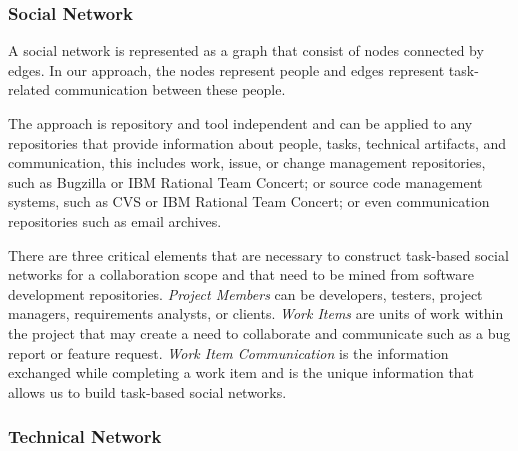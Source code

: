 \subsubsection{Social Network}
A social network is represented as a graph that consist of nodes connected by edges. 
In our approach, the nodes represent people and edges represent task-related communication between these people.

The approach is repository and tool independent and can be applied to any repositories that provide information about people, tasks, technical artifacts, and communication, this includes work, issue, or change management repositories, such as Bugzilla or IBM Rational Team Concert; or source code management systems, such as CVS or IBM Rational Team Concert; or even communication repositories such as email archives.

There are three critical elements that are necessary to construct task-based social networks for a collaboration scope and that need to be mined from software development repositories.
\emph{Project Members}  can be developers, testers, project managers, requirements analysts,
or clients. 
\emph{Work Items} are units of work within the project that may create a need to collaborate and communicate such as a bug report or feature request.
\emph{Work Item Communication} is the information exchanged while completing a work item and is the unique information that allows us to build task-based social networks.



\subsubsection{Technical Network}


